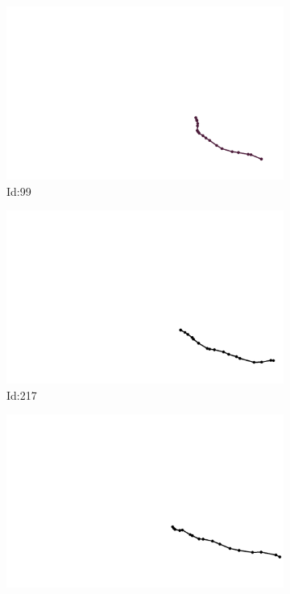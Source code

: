 \documentclass[12pt,twoside]{report}
\begin{document}
\begin{figure}
\centering
\begin{subfigure}[b]{0.20\textwidth}
\centering
\includegraphics[width=\textwidth]{../../trajectories/99.png}
\caption{Id:99}
\end{subfigure}
\begin{subfigure}[b]{0.20\textwidth}
\centering
\includegraphics[width=\textwidth]{../../trajectories/217.png}
\caption{Id:217}
\end{subfigure}
\begin{subfigure}[b]{0.20\textwidth}
\centering
\includegraphics[width=\textwidth]{../../trajectories/280.png}

\end{subfigure}
\end{figure}
\end{document}
